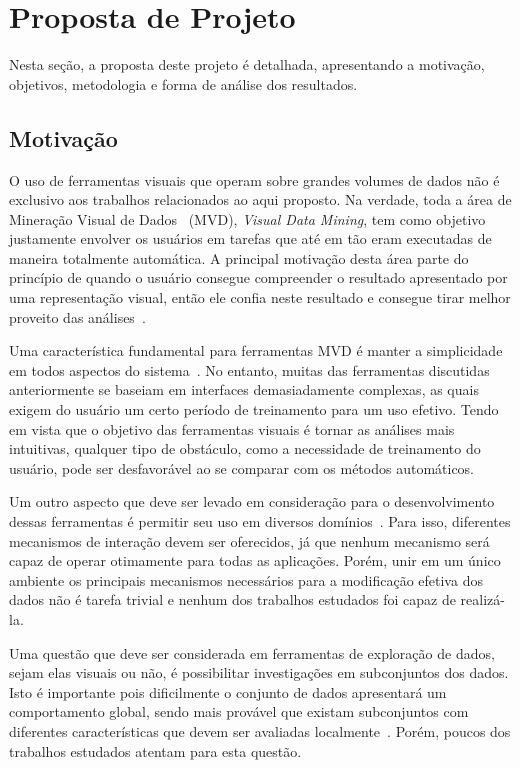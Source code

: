 \section{Proposta de Projeto}\label{sec:proposal}

Nesta seção, a proposta deste projeto é detalhada, apresentando a motivação, objetivos, metodologia e forma de análise dos resultados.

\subsection{Motivação}

O uso de ferramentas visuais que operam sobre grandes
volumes de dados não é exclusivo aos trabalhos relacionados
ao aqui proposto. Na verdade, toda a área de
Mineração Visual de Dados~\cite{Wong1999} (MVD),
\emph{Visual Data Mining}, tem como objetivo justamente
envolver os usuários em tarefas que até em tão eram
executadas de maneira totalmente automática. A principal
motivação desta área parte do princípio de quando o usuário
consegue compreender o resultado apresentado por uma
representação visual, então ele confia neste resultado e
consegue tirar melhor proveito das análises~\cite{Wong1999}.

Uma característica fundamental para ferramentas MVD é manter
a simplicidade em todos aspectos do sistema~\cite{Wong1999}.
No entanto, muitas das ferramentas discutidas anteriormente
se baseiam em interfaces demasiadamente complexas, as quais
exigem do usuário um certo período de treinamento para um
uso efetivo. Tendo em vista que o objetivo das ferramentas
visuais é tornar as análises mais intuitivas, qualquer tipo
de obstáculo, como a necessidade de treinamento do usuário,
pode ser desfavorável ao se comparar com os métodos
automáticos.

Um outro aspecto que deve ser levado em consideração para o
desenvolvimento dessas ferramentas é permitir seu uso em
diversos domínios~\cite{Wong1999}. Para isso, diferentes
mecanismos de interação devem ser oferecidos, já que nenhum
mecanismo será capaz de operar otimamente para todas as
aplicações. Porém, unir em um único ambiente os principais
mecanismos necessários para a modificação efetiva dos dados
não é tarefa trivial e nenhum dos trabalhos estudados foi
capaz de realizá-la.

Uma questão que deve ser considerada em ferramentas de
exploração de dados, sejam elas visuais ou não, é
possibilitar investigações em subconjuntos dos dados. Isto é
importante pois dificilmente o conjunto de dados apresentará
um comportamento global, sendo mais provável que existam
subconjuntos com diferentes características que devem ser
avaliadas localmente~\cite{May2011}. Porém, poucos dos
trabalhos estudados atentam para esta questão.

